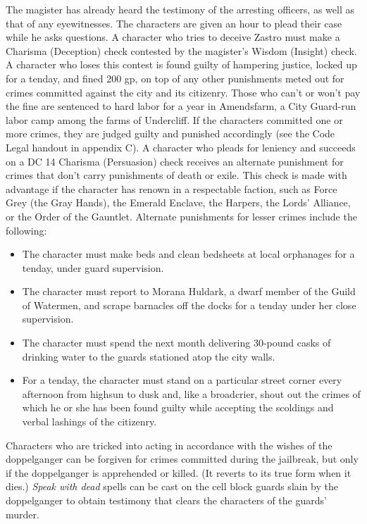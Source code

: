 \documentclass[10pt,a4paper,twoside,twocolumn,openany,nodeprecatedcode]{dndbook}
\begin{document}
The magister has already heard the testimony of the arresting officers, as well as that of any eyewitnesses. The characters are given an hour to plead their case while he asks questions. A character who tries to deceive Zastro must make a Charisma (Deception) check contested by the magister's Wisdom (Insight) check. A character who loses this contest is found guilty of hampering justice, locked up for a tenday, and fined 200 gp, on top of any other punishments meted out for crimes committed against the city and its citizenry. Those who can't or won't pay the fine are sentenced to hard labor for a year in Amendsfarm, a City Guard-run labor camp among the farms of Undercliff.
If the characters committed one or more crimes, they are judged guilty and punished accordingly (see the Code Legal handout in appendix C). A character who pleads for leniency and succeeds on a DC 14 Charisma (Persuasion) check receives an alternate punishment for crimes that don't carry punishments of death or exile. This check is made with advantage if the character has renown in a respectable faction, such as Force Grey (the Gray Hands), the Emerald Enclave, the Harpers, the Lords' Alliance, or the Order of the Gauntlet. Alternate punishments for lesser crimes include the following:
\begin{itemize}

\item The character must make beds and clean bedsheets at local orphanages for a tenday, under guard supervision.
\item The character must report to Morana Huldark, a dwarf member of the Guild of Watermen, and scrape barnacles off the docks for a tenday under her close supervision.
\item The character must spend the next month delivering 30-pound casks of drinking water to the guards stationed atop the city walls.
\item For a tenday, the character must stand on a particular street corner every afternoon from highsun to dusk and, like a broadcrier, shout out the crimes of which he or she has been found guilty while accepting the scoldings and verbal lashings of the citizenry.
\end{itemize}


Characters who are tricked into acting in accordance with the wishes of the doppelganger can be forgiven for crimes committed during the jailbreak, but only if the doppelganger is apprehended or killed. (It reverts to its true form when it dies.) \textit{Speak with dead} spells can be cast on the cell block guards slain by the doppelganger to obtain testimony that clears the characters of the guards' murder.
\end{document}
